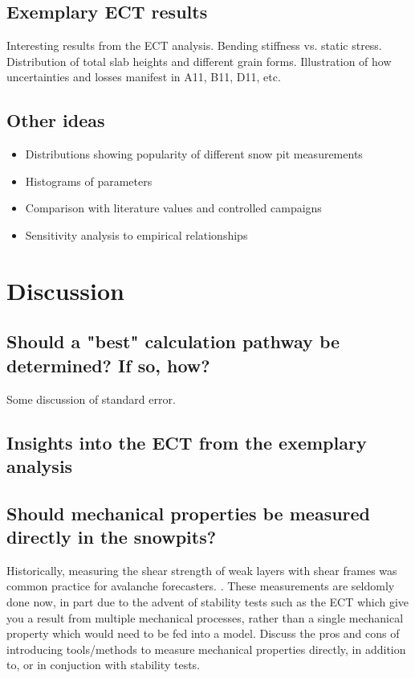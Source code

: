 \documentclass[journal abbreviation, manuscript]{copernicus}
\begin{document}
\subsection{Exemplary ECT results}
\textcolor{RubineRed}{Interesting results from the ECT analysis. Bending stiffness vs. static stress. Distribution of total slab heights and different grain forms. Illustration of how uncertainties and losses manifest in A11, B11, D11, etc. }


\subsection{Other ideas}
\begin{itemize}
    \item Distributions showing popularity of different snow pit measurements
    \item Histograms of parameters
    \item Comparison with literature values and controlled campaigns
    \item Sensitivity analysis to empirical relationships
\end{itemize}

\section{Discussion}
\subsection{Should a "best" calculation pathway be determined? If so, how?}

Some discussion of standard error.

\subsection{ Insights into the ECT from the exemplary analysis}

\subsection{Should mechanical properties be measured directly in the snowpits?}
Historically, measuring the shear strength of weak layers with shear frames was common practice for avalanche forecasters. \citet{perla1982}. These measurements are seldomly done now, in part due to the advent of stability tests such as the ECT which give you a result from multiple mechanical processes, rather than a single mechanical property which would need to be fed into a model. \textcolor{RubineRed}{Discuss the pros and cons of introducing tools/methods to measure mechanical properties directly, in addition to, or in conjuction with stability tests.}
\end{document}
